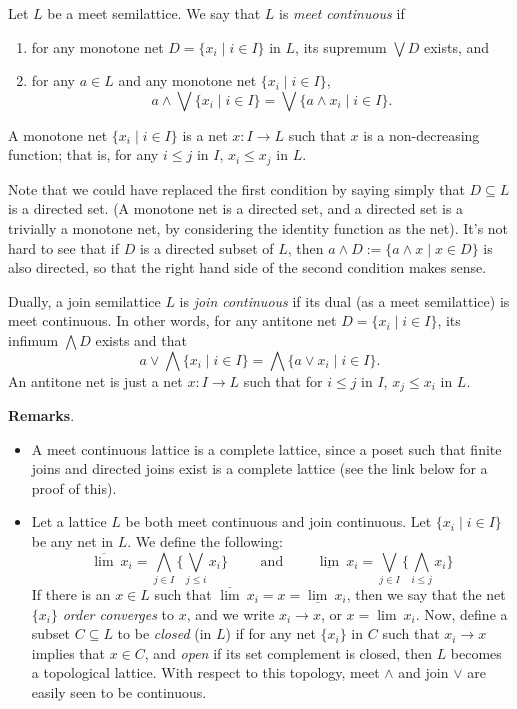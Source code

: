 \documentclass[12pt]{article}
\begin{document}
Let $L$ be a meet semilattice.  We say that $L$ is \emph{meet continuous} if
\begin{enumerate}
\item for any monotone net $D=\lbrace x_i \mid i\in I\rbrace$ in $L$, its supremum $\bigvee D$ exists, and 
\item for any $a\in L$ and any monotone net $\lbrace x_i\mid i\in I\rbrace$,  $$a\wedge \bigvee \lbrace x_i \mid i\in I \rbrace = \bigvee \lbrace a\wedge x_i\mid i\in I \rbrace.$$ 
\end{enumerate}

A monotone net $\lbrace x_i\mid i\in I\rbrace$ is a net $x:I\to L$ such that $x$ is a non-decreasing function; that is, for any $i\le j$ in $I$, $x_i\le x_j$ in $L$.

Note that we could have replaced the first condition by saying simply that $D\subseteq L$ is a directed set.  (A monotone net is a directed set, and a directed set is a trivially a monotone net, by considering the identity function as the net).  It's not hard to see that if $D$ is a directed subset of $L$, then $a\wedge D:=\lbrace a\wedge x\mid x\in D\rbrace$ is also directed, so that the right hand side of the second condition makes sense.

Dually, a join semilattice $L$ is \emph{join continuous} if its dual (as a meet semilattice) is meet continuous.  In other words, for any antitone net $D=\lbrace x_i\mid i\in I\rbrace$, its infimum $\bigwedge D$ exists and that 
$$a\vee \bigwedge \lbrace x_i\mid i\in I\rbrace =\bigwedge \lbrace a\vee x_i\mid i\in I\rbrace.$$
An antitone net is just a net $x:I\to L$ such that for $i\le j$ in $I$, $x_j\le x_i$ in $L$.

\textbf{Remarks}.
\begin{itemize}
\item A meet continuous lattice is a complete lattice, since a poset such that finite joins and directed joins exist is a complete lattice (see the link below for a proof of this).
\item 
Let a lattice $L$ be both meet continuous and join continuous.  Let $\lbrace x_i\mid i\in I\rbrace$ be any net in $L$.  We define the following:
$$\overline{\lim}\ x_i = \bigwedge_{j\in I} \lbrace \bigvee_{j\le i} x_i\rbrace\qquad\mbox{ and }\qquad\underline{\lim}\ x_i = \bigvee_{j\in I} \lbrace \bigwedge_{i\le j} x_i\rbrace$$
If there is an $x\in L$ such that $\overline{\lim}\ x_i=x=\underline{\lim}\ x_i$, then we say that the net $\lbrace x_i\rbrace$ \emph{order converges} to $x$, and we write $x_i\to x$, or $x=\lim\ x_i$.  Now, define a subset $C\subseteq L$ to be \emph{closed} (in $L$) if for any net $\lbrace x_i\rbrace$ in $C$ such that $x_i\to x$ implies that $x\in C$, and \emph{open} if its set complement is closed, then $L$ becomes a topological lattice.  With respect to this topology, meet $\wedge$ and join $\vee$ are easily seen to be continuous.
\end{itemize}
\end{document}
